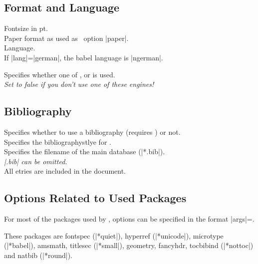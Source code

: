 \subsection{Format and Language}

Fontsize in pt. \\

Paper format as used as \report\ option |paper|. \\

Language. \\ If |lang|=|german|, the babel language is |ngerman|.

Specifies whether one of ,  or  is used. \\
\emph{Set to false if you don't use one of these engines!}



\subsection{Bibliography}

Specifies whether to use a bibliography (requires ) or not. \\

Specifies the bibliographystlye for . \\

Specifies the filename of the main  database (|*.bib|). \\
\emph{|.bib| can be omitted.} \\
All etries are included in the document.



\subsection{Options Related to Used Packages}

For most of the packages used by \wsemclassic, options can be specified in
the format |args|=.

These packages are \textsf{fontspec (|*quiet|), hyperref (|*unicode|),
	microtype (|*babel|), amsmath, titlesec (|*small|), geometry, fancyhdr,
tocbibind (|*nottoc|)} and \textsf{natbib (|*round|)}. \\

